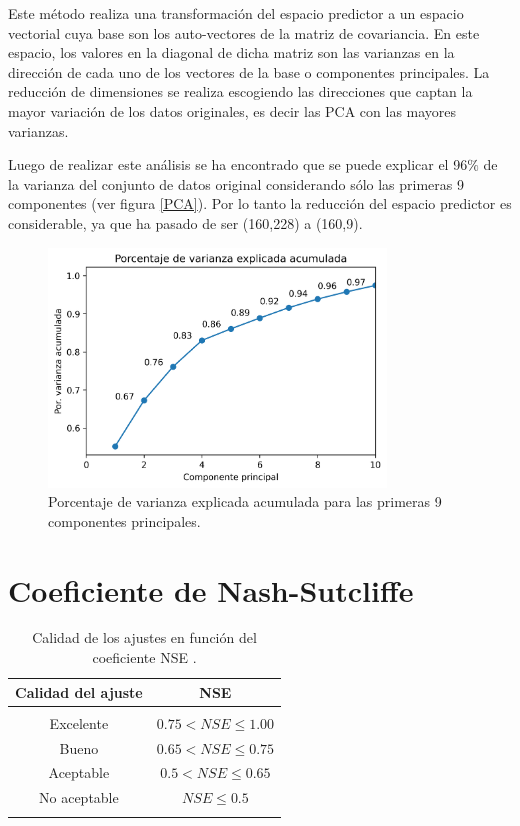 Este método realiza una transformación del espacio predictor a un espacio vectorial 
cuya base son los auto-vectores de la matriz de covariancia. 
En este espacio, los valores en la diagonal de dicha matriz son las varianzas
en la dirección de cada uno de los vectores de la base o componentes principales.
La reducción de dimensiones se realiza escogiendo las direcciones que captan la mayor variación 
de los datos originales, es decir las PCA con las mayores varianzas. 

Luego de realizar este análisis se ha encontrado que se puede explicar el 96$\%$ de la varianza del conjunto
de datos original considerando sólo las primeras 9 componentes (ver figura \ref{PCA}). Por lo tanto la reducción del espacio
predictor es considerable, ya que ha pasado de ser (160,228) a (160,9).

\begin{figure}[h!]
  \begin{center}
    \includegraphics[height=2.5in]{Figures/PCA.png}
    \caption{ Porcentaje de varianza explicada acumulada para las primeras 9 componentes principales.}
    \label{KCV}
  \end{center}
\end{figure}

\section{Coeficiente de Nash-Sutcliffe}
\label{sectNSE}


\begin{table}[h!]
  \begin{center}
  \begin{tabular}{|c|c|}
    \hline
    Calidad del ajuste &   NSE  \\
    \hline
     &   \\
   Excelente & $0.75 < NSE \leq 1.00$   \\
   Bueno &  $0.65<  NSE \leq 0.75$ \\
   Aceptable &  $0.5<  NSE \leq 0.65$  \\
   No aceptable &  $ NSE \leq 0.5$ \\
   &   \\
   \hline
  \end{tabular}
  \caption{Calidad de los ajustes en función del coeficiente NSE \cite{NSE}.}
  \label{tablaNSE}
\end{center}
  \end{table}

